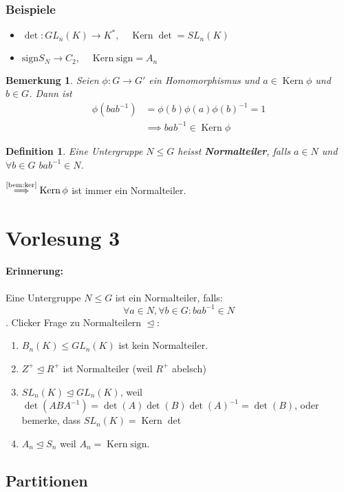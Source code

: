 \documentclass{article}
\theoremstyle{plain}
\newtheorem{definition}{Definition}
\newtheorem{bemerkung}{Bemerkung}
\renewcommand{\ker}{\mathop{\mathrm{Kern}}}
\newcommand{\defn}[1]{\textbf{#1}}
\newcommand{\ug}{\leq}
\newcommand{\normal}{\trianglelefteq}
\newcommand{\sgn}{\mathrm{sign}}
\begin{document}
\subsubsection*{Beispiele}
\begin{itemize}
    \item $\det\colon GL_n(K)\to K^*,\quad \ker\det=SL_n(K)$
    \item $\sgn S_N\to C_2,\quad \ker\sgn=A_n$
\end{itemize}
\begin{bemerkung}\label{bem:ker}
    Seien $\phi\colon G\to G'$ ein Homomorphismus und $a\in \ker\phi$ und $b\in G$. 
    Dann ist 
    \begin{align*}
        \phi(bab^{-1})&=\phi(b)\phi(a)\phi(b)^{-1}=1\\
        &\implies bab^{-1}\in\ker\phi
    \end{align*}
\end{bemerkung}
\begin{definition}
    Eine Untergruppe $N\leq G$ heisst \defn{Normalteiler}, falls $a\in N$ und $\forall b\in G$ $bab^{-1}\in N$.
\end{definition}
$\overset{\text{\cref{bem:ker}}}{\implies}\ker\phi$ ist immer ein Normalteiler.

\section*{Vorlesung 3}
\paragraph{Erinnerung:}
Eine Untergruppe $N\ug G$ ist ein Normalteiler, falls:
$$\forall a\in N, \forall b \in G: bab^{-1}\in N $$.
Clicker Frage zu Normalteilern $\normal$:
\begin{enumerate}
    \item $B_n(K) \ug GL_n(K)$ ist kein Normalteiler.
    \item $Z^+ \normal R^+$ ist Normalteiler (weil $R^+$ abelsch)
    \item $SL_n(K) \normal GL_n(K)$, weil $\det(ABA^{-1}) = \det(A)\det(B)\det(A)^{-1}=\det(B)$, oder bemerke, dass $SL_n(K)=\ker \det$
    \item $A_n\normal S_n$ weil $A_n=\ker\sgn$.
\end{enumerate}

\subsection*{Partitionen}
\end{document}

